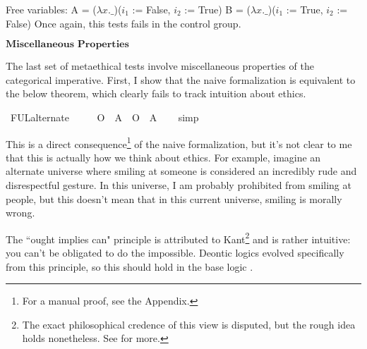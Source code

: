 \begin{isabellebody}
{  Free variables:
    A = ($\lambda x. \_$)($i_1$ := False, $i_2$ := True)
    B = ($\lambda x. \_$)($i_1$ := True, $i_2$ := False)\color{black}
Once again, this tests fails in the control group.%
}%
\endisatagproof
{\isafoldproof}%
%
\isadelimproof
%
\endisadelimproof
%
\begin{isamarkuptext}%
$\textbf{Miscellaneous Properties}$%
\end{isamarkuptext}\isamarkuptrue%
%
\begin{isamarkuptext}%
The last set of metaethical tests involve miscellaneous properties of the categorical 
imperative. First, I show that the naive formalization is equivalent to the below theorem, which clearly
fails to track intuition about ethics.%
\end{isamarkuptext}\isamarkuptrue%
\isamarkupfalse%
\ FUL{\isacharunderscore}alternate{\isacharcolon}\isanewline
\ \ \ {\isachardoublequoteopen}{\isasymTurnstile}\ {\isacharparenleft}{\isacharparenleft}{\isasymdiamond}\ {\isacharparenleft}O\ {\isacharbraceleft}\isactrlbold {\isasymnot}\ A{\isacharbraceright}{\isacharparenright}{\isacharparenright}\ \isactrlbold {\isasymrightarrow}\ {\isacharparenleft}O\ {\isacharbraceleft}\isactrlbold {\isasymnot}\ A{\isacharbraceright}{\isacharparenright}{\isacharparenright}{\isachardoublequoteclose}\isanewline
%
\isadelimproof
\ \ %
\endisadelimproof
%
\isatagproof
{}\isamarkupfalse%
\ simp\isanewline
%
%
\endisatagproof
{\isafoldproof}%
%
\isadelimproof
%
\endisadelimproof
%
\begin{isamarkuptext}%
This is a direct consequence\footnote{For a manual proof, see the Appendix.} of the naive formalization, but it's not clear to me that this is
actually how we think about ethics. For example, imagine an alternate universe where smiling at 
someone is considered an incredibly rude and disrespectful gesture. In this universe, I am probably 
prohibited from smiling at people, but this doesn't mean that in this current universe, smiling is 
morally wrong.%
\end{isamarkuptext}\isamarkuptrue%
%
\begin{isamarkuptext}%
The ``ought implies can" principle is attributed to Kant\footnote{The exact philosophical credence of this view is disputed, but the rough idea holds nonetheless. See \cite{kohl} for more.}
 and is rather intuitive: you can't be obligated to do the impossible. Deontic 
logics evolved specifically from this principle, so this should hold in the base logic \citep{cresswell}.%

\end{isamarkuptext}
\end{isabellebody}
